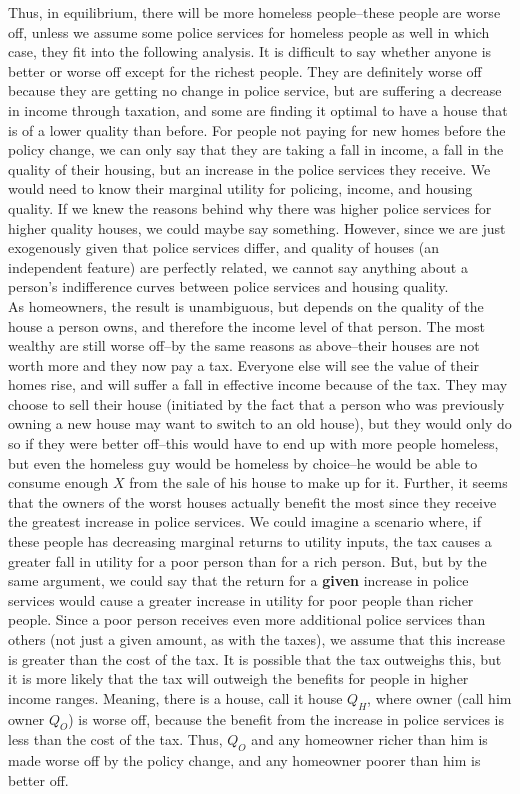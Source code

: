 \documentclass[12pt]{paper}
\begin{document}
Thus, in equilibrium, there will be more homeless people--these people are worse off, unless we assume some police services for homeless people as well in which case, they fit into the following analysis. It is difficult to say whether anyone is better or worse off except for the richest people. They are definitely worse off because they are getting no change in police service, but are suffering a decrease in income through taxation, and some are finding it optimal to have a house that is of a lower quality than before. For people not paying for new homes before the policy change, we can only say that they are taking a fall in income, a fall in the quality of their housing, but an increase in the police services they receive. We would need to know their marginal utility for policing, income, and housing quality. If we knew the reasons behind why there was higher police services for higher quality houses, we could maybe say something. However, since we are just exogenously given that police services differ, and quality of houses (an independent feature) are perfectly related, we cannot say anything about a person's indifference curves between police services and housing quality.\\


As homeowners, the result is unambiguous, but depends on the quality of the house a person owns, and therefore the income level of that person. The most wealthy are still worse off--by the same reasons as above--their houses are not worth more and they now pay a tax. Everyone else will see the value of their homes rise, and will suffer a fall in effective income because of the tax. They may choose to sell their house (initiated by the fact that a person who was previously owning a new house may want to switch to an old house), but they would only do so if they were better off--this would have to end up with more people homeless, but even the homeless guy would be homeless by choice--he would be able to consume enough $X$ from the sale of his house to make up for it. Further, it seems that the owners of the worst houses actually benefit the most since they receive the greatest increase in police services. We could imagine a scenario where, if these people has decreasing marginal returns to utility inputs, the tax causes a greater fall in utility for a poor person than for a rich person. But, but by the same argument, we could say that the return for a \textbf{given} increase in police services would cause a greater increase in utility for poor people than richer people. Since a poor person receives even more additional police services than others (not just a given amount, as with the taxes), we assume that this increase is greater than the cost of the tax. It is possible that the tax outweighs this, but it is more likely that the tax will outweigh the benefits for people in higher income ranges. Meaning, there is a house, call it house $Q_H$, where owner (call him owner $Q_O$) is worse off, because the benefit from the increase in police services is less than the cost of the tax. Thus, $Q_O$ and any homeowner richer than him is made worse off by the policy change, and any homeowner poorer than him is better off.
\end{document}
